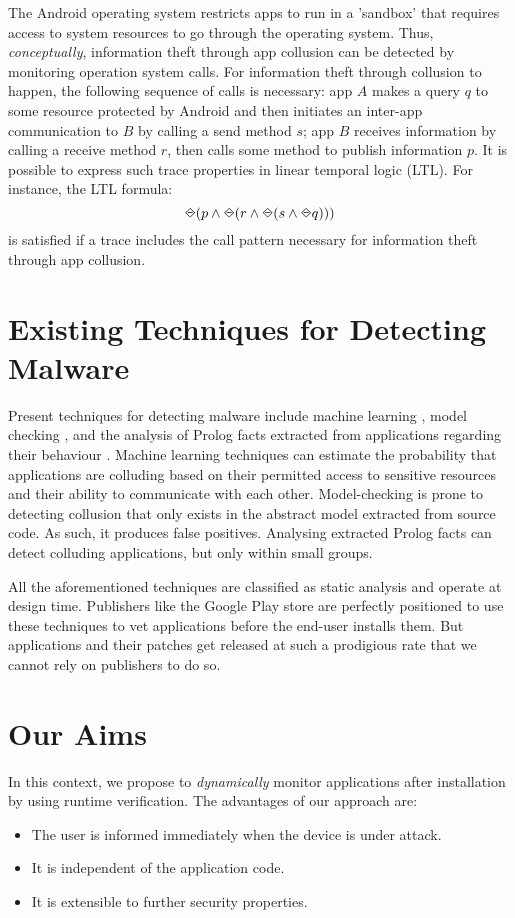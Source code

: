 The Android operating system restricts apps to run in a 'sandbox' that requires access to system resources to go through the operating system.  Thus, \emph{conceptually}, information theft through app collusion can be detected by monitoring operation system calls.  For information theft through collusion to happen, the following sequence of calls is necessary: app $A$ makes a query $q$ to some resource protected by Android and then initiates an inter-app communication to $B$ by calling a send method $s$; app $B$ receives information by calling a receive method $r$, then calls some method to publish information $p$.  It is possible to express such trace properties in linear temporal logic (LTL).  For instance, the LTL formula: $$ \LTLonce(p \land \LTLonce(r \land \LTLonce(s \land \LTLonce q)))$$ is satisfied if a trace includes the call pattern necessary for information theft through app collusion.

\section{Existing Techniques for Detecting Malware}

Present techniques for detecting malware include machine learning \cite{ThreatAssesmentAppCollusion}, model checking \cite{ModelCheckingCollusion}, and the analysis of Prolog facts extracted from applications regarding their behaviour \cite{PrologAppCollusion}.  Machine learning techniques can estimate the probability that applications are colluding based on their permitted access to sensitive resources and their ability to communicate with each other.   Model-checking is prone to detecting collusion that only exists in the abstract model extracted from source code.  As such, it produces false positives.  Analysing extracted Prolog facts can detect colluding applications, but only within small groups.

All the aforementioned techniques are classified as static analysis and operate at design time.  Publishers like the Google Play store are perfectly positioned to use these techniques to vet applications before the end-user installs them.  But applications and their patches get released at such a prodigious rate that we cannot rely on publishers to do so.

\section{Our Aims}

In this context, we propose to \emph{dynamically} monitor applications after installation by using runtime verification.  The advantages of our approach are:
\begin{itemize}
\item The user is informed immediately when the device is under attack.
\item It is independent of the application code.
\item It is extensible to further security properties.
\end{itemize}

